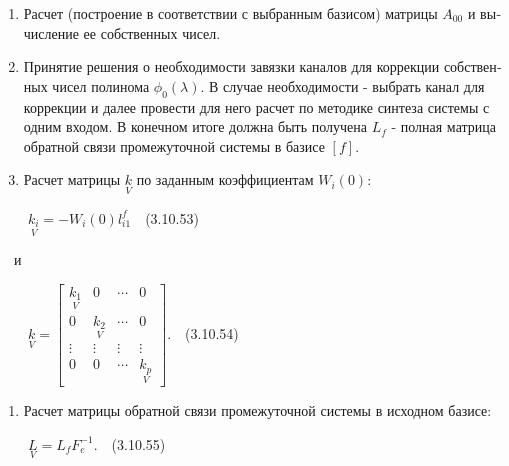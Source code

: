 \documentclass[a4paper]{article}
\newcounter{saveenum}
\newcommand\liststyleWWviiiNumxxii{%
\renewcommand\theenumi{\arabic{enumi}}
\renewcommand\theenumii{\arabic{enumii}}
\renewcommand\theenumiii{\arabic{enumiii}}
\renewcommand\theenumiv{\arabic{enumiv}}
\renewcommand\labelenumi{\theenumi.}
\renewcommand\labelenumii{\theenumii.}
\renewcommand\labelenumiii{\theenumiii.}
\renewcommand\labelenumiv{\theenumiv.}
}
\newcommand\liststyleWWviiiNumlxxv{%
\renewcommand\theenumi{\arabic{enumi}}
\renewcommand\theenumii{\arabic{enumii}}
\renewcommand\theenumiii{\arabic{enumiii}}
\renewcommand\theenumiv{\arabic{enumiv}}
\renewcommand\labelenumi{\theenumi.}
\renewcommand\labelenumii{\theenumii.}
\renewcommand\labelenumiii{\theenumiii.}
\renewcommand\labelenumiv{\theenumiv.}
}
\begin{document}
\liststyleWWviiiNumxxii
\setcounter{saveenum}{\value{enumi}}
\begin{enumerate}
\setcounter{enumi}{\value{saveenum}}
\item {\begin{russian}\sffamily
Расчет (построение в соответствии с выбранным базисом) матрицы  $A_{00}$ и вычисление ее собственных чисел.
\end{russian}}
\item {\begin{russian}\sffamily
Принятие решения о необходимости завязки каналов для коррекции собственных чисел полинома  $ϕ_0(λ)$. В случае
необходимости - выбрать канал для коррекции и далее провести для него расчет по методике синтеза системы с одним
входом. В конечном итоге должна быть получена  $L_f$ - полная матрица обратной связи промежуточной системы в базисе 
$[f]$.
\end{russian}}
\item {\begin{russian}\sffamily
Расчет матрицы  $\underset V{k}$ по заданным коэффициентам  $W_i(0):$
\end{russian}}
\end{enumerate}
{\begin{russian}\sffamily
\ \ \ \  $\underset V{k_i}=-W_i(0)l_{\mathit{i1}}^f$\ \ (3.10.53)
\end{russian}}

{\begin{russian}\sffamily
\ \ и
\end{russian}}

{\begin{russian}\sffamily
\ \ \ \  $\underset V{k}=\left[\begin{matrix}\underset V{k_1}&0&\cdots &0\\0&\underset V{k_2}&\cdots &0\\\vdots &\vdots
&\vdots &\vdots \\0&0&\cdots &\underset V{k_p}\end{matrix}\right]$.\ \ (3.10.54)
\end{russian}}

\liststyleWWviiiNumlxxv
\begin{enumerate}
\item {\begin{russian}\sffamily
Расчет матрицы обратной связи промежуточной системы в исходном базисе:
\end{russian}}
\end{enumerate}
{\begin{russian}\sffamily
\ \ \ \  $\underset V{L}=L_fF_e^{-1}.$\ \ (3.10.55)
\end{russian}}
\end{document}
